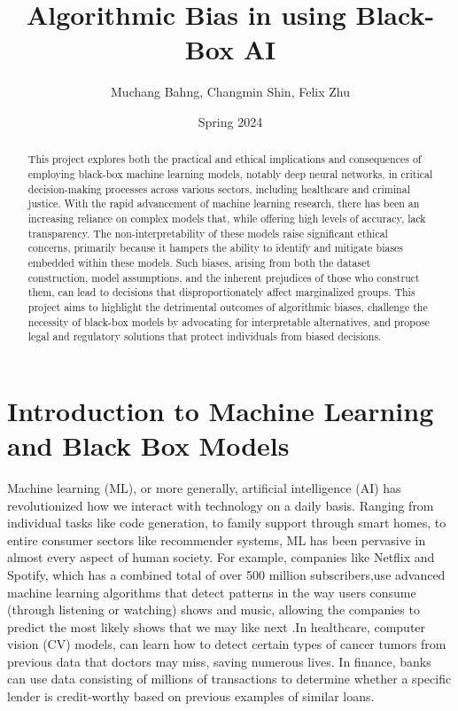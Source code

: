 \documentclass[10pt]{article}
\begin{document}
\title{Algorithmic Bias in using Black-Box AI}
\author{Muchang Bahng, Changmin Shin, Felix Zhu}
\date{Spring 2024}

\maketitle

\begin{abstract}
  This project explores both the practical and ethical implications and consequences of employing black-box machine learning models, notably deep neural networks, in critical decision-making processes across various sectors, including healthcare and criminal justice. With the rapid advancement of machine learning research, there has been an increasing reliance on complex models that, while offering high levels of accuracy, lack transparency. The non-interpretability of these models raise significant ethical concerns, primarily because it hampers the ability to identify and mitigate biases embedded within these models. Such biases, arising from both the dataset construction, model assumptions, and the inherent prejudices of those who construct them, can lead to decisions that disproportionately affect marginalized groups. This project aims to highlight the detrimental outcomes of algorithmic biases, challenge the necessity of black-box models by advocating for interpretable alternatives, and propose legal and regulatory solutions that protect individuals from biased decisions. 
\end{abstract}

\section{Introduction to Machine Learning and Black Box Models}

  Machine learning (ML), or more generally, artificial intelligence (AI) has revolutionized how we interact with technology on a daily basis. Ranging from individual tasks like code generation, to family support through smart homes, to entire consumer sectors like recommender systems, ML has been pervasive in almost every aspect of human society. For example, companies like Netflix and Spotify, which has a combined total of over 500 million subscribers,use advanced machine learning algorithms that detect patterns in the way users consume (through listening or watching) shows and music, allowing the companies to predict the most likely shows that we may like next \cite{netflix, spotify}.In healthcare, computer vision (CV) models, can learn how to detect certain types of cancer tumors from previous data that doctors may miss, saving numerous lives. In finance, banks can use data consisting of millions of transactions to determine whether a specific lender is credit-worthy based on previous examples of similar loans. 
\end{document}
